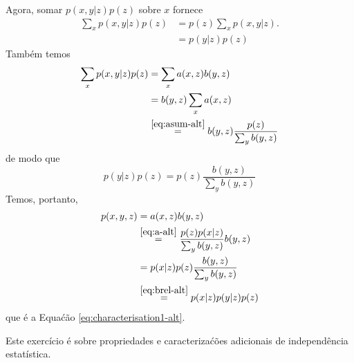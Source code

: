 \begin{solution}
    Agora, somar $p(x,y | z) p(z)$ sobre $x$ fornece
    \begin{align}
        \sum_x  p(x,y | z) p(z) & =  p(z) \sum_x p(x,y|z). \\
        & = p(y | z) p(z)
    \end{align}
    Tamb\'em temos
    \begin{align}
        \sum_x  p(x,y | z) p(z) &= \sum_x a(x,z) b(y,z) \\
        &= b(y,z) \sum_x a(x,z) \\
        &\stackrel{\eqref{eq:asum-alt}}{=} b(y,z) \frac{p(z)}{\sum_y b(y,z)}
    \end{align}
    de modo que
    \begin{equation}
        p(y | z) p(z) =  p(z) \frac{b(y,z)}{\sum_y b(y,z)}
        \label{eq:brel-alt}
    \end{equation}
    Temos, portanto,
    \begin{align}
        p(x,y,z) & = a(x,z) b(y,z) \\
        &  \stackrel{\eqref{eq:a-alt}}{=} \frac{p(z) p(x | z)}{\sum_y b(y,z)} b(y,z) \\
        & = p(x | z)p(z) \frac{ b(y,z)}{\sum_y b(y,z)} \\
        & \stackrel{\eqref{eq:brel-alt}}{=} p(x|z) p(y|z) p(z)
    \end{align}
    que \'e a Equa\'c\~ao \eqref{eq:characterisation1-alt}.
\end{solution}


\label{ex:independencies2-bis}
Este exerc\'icio \'e sobre propriedades e caracteriza\'c\~oes adicionais de independ\^encia estat\'istica.

